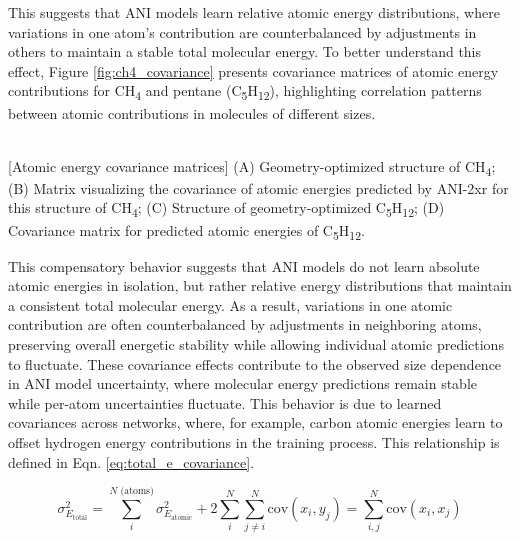 This suggests that ANI models learn relative atomic energy distributions, where variations in one atom's contribution are counterbalanced by adjustments in others to maintain a stable total molecular energy. To better understand this effect, Figure \ref{fig:ch4_covariance} presents covariance matrices of atomic energy contributions for CH\textsubscript{4} and pentane (C\textsubscript{5}H\textsubscript{12}), highlighting correlation patterns between atomic contributions in molecules of different sizes.

\begin{flushleft}
\begin{multiFigure}
     \\
[Atomic energy covariance matrices]{
(A) Geometry-optimized structure of CH\textsubscript{4}; 
(B) Matrix visualizing the covariance of atomic energies predicted by ANI-2xr for this structure of CH\textsubscript{4}; 
(C) Structure of geometry-optimized C\textsubscript{5}H\textsubscript{12}; 
(D) Covariance matrix for predicted atomic energies of C\textsubscript{5}H\textsubscript{12}.}
\label{fig:ch4_covariance}
\end{multiFigure}
\end{flushleft}

This compensatory behavior suggests that ANI models do not learn absolute atomic energies in isolation, but rather relative energy distributions that maintain a consistent total molecular energy. As a result, variations in one atomic contribution are often counterbalanced by adjustments in neighboring atoms, preserving overall energetic stability while allowing individual atomic predictions to fluctuate.
These covariance effects contribute to the observed size dependence in ANI model uncertainty, where molecular energy predictions remain stable while per-atom uncertainties fluctuate.
This behavior is due to learned covariances across networks, where, for example, carbon atomic energies learn to offset hydrogen energy contributions in the training process. This relationship is defined in Eqn. \ref{eq:total_e_covariance}.

\begin{equation}
    \sigma_{E_{\text{total}}}^2 = \sum_i^{N \text{ (atoms)}} \sigma_{E_{\text{atomic}}}^2 + 2 \sum_i^N \sum_{j \neq i}^N \text{cov}(x_i, y_j) = \sum_{i,j}^N \text{cov}(x_i, x_j)
    \label{eq:total_e_covariance}
\end{equation}

